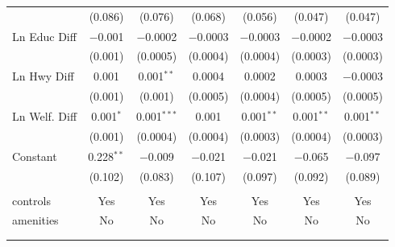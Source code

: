\begin{table}[!htbp]
\begin{tabular}{@{\extracolsep{5pt}}lcccccc}
  & (0.086) & (0.076) & (0.068) & (0.056) & (0.047) & (0.047) \\ 
  Ln Educ Diff & $-$0.001 & $-$0.0002 & $-$0.0003 & $-$0.0003 & $-$0.0002 & $-$0.0003 \\ 
  & (0.001) & (0.0005) & (0.0004) & (0.0004) & (0.0003) & (0.0003) \\ 
  Ln Hwy Diff & 0.001 & 0.001$^{**}$ & 0.0004 & 0.0002 & 0.0003 & $-$0.0003 \\ 
  & (0.001) & (0.001) & (0.0005) & (0.0004) & (0.0005) & (0.0005) \\ 
  Ln Welf. Diff & 0.001$^{*}$ & 0.001$^{***}$ & 0.001 & 0.001$^{**}$ & 0.001$^{**}$ & 0.001$^{**}$ \\ 
  & (0.001) & (0.0004) & (0.0004) & (0.0003) & (0.0004) & (0.0003) \\ 
  Constant & 0.228$^{**}$ & $-$0.009 & $-$0.021 & $-$0.021 & $-$0.065 & $-$0.097 \\ 
  & (0.102) & (0.083) & (0.107) & (0.097) & (0.092) & (0.089) \\ 
 \hline \\[-1.8ex] 
controls & Yes & Yes & Yes & Yes & Yes & Yes \\ 
amenities & No & No & No & No & No & No \\ 
\hline \\[-1.8ex] 
\hline 
\hline \\[-1.8ex] 
\end{tabular} 
\end{table} 
